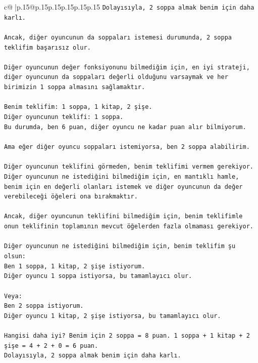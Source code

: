 \documentclass{article}
\begin{document}
{\begin{supertabular}{c@{$\;$}|p{.15\linewidth}@{}p{.15\linewidth}p{.15\linewidth}p{.15\linewidth}p{.15\linewidth}p{.15\linewidth}}
{{{\texttt{Dolayısıyla, 2 soppa almak benim için daha karlı.} \\
\\ 
\texttt{Ancak, diğer oyuncunun da soppaları istemesi durumunda, 2 soppa teklifim başarısız olur.} \\
\\ 
\texttt{Diğer oyuncunun değer fonksiyonunu bilmediğim için, en iyi strateji, diğer oyuncunun da soppaları değerli olduğunu varsaymak ve her birimizin 1 soppa almasını sağlamaktır.} \\
\\ 
\texttt{Benim teklifim: 1 soppa, 1 kitap, 2 şişe.} \\
\texttt{Diğer oyuncunun teklifi: 1 soppa.} \\
\texttt{Bu durumda, ben 6 puan, diğer oyuncu ne kadar puan alır bilmiyorum.} \\
\\ 
\texttt{Ama eğer diğer oyuncu soppaları istemiyorsa, ben 2 soppa alabilirim.} \\
\\ 
\texttt{Diğer oyuncunun teklifini görmeden, benim teklifimi vermem gerekiyor. Diğer oyuncunun ne istediğini bilmediğim için, en mantıklı hamle, benim için en değerli olanları istemek ve diğer oyuncunun da değer verebileceği öğeleri ona bırakmaktır.} \\
\\ 
\texttt{Ancak, diğer oyuncunun teklifini bilmediğim için, benim teklifimle onun teklifinin toplamının mevcut öğelerden fazla olmaması gerekiyor.} \\
\\ 
\texttt{Diğer oyuncunun ne istediğini bilmediğim için, benim teklifim şu olsun:} \\
\texttt{Ben 1 soppa, 1 kitap, 2 şişe istiyorum.} \\
\texttt{Diğer oyuncu 1 soppa istiyorsa, bu tamamlayıcı olur.} \\
\\ 
\texttt{Veya:} \\
\texttt{Ben 2 soppa istiyorum.} \\
\texttt{Diğer oyuncu 1 kitap, 2 şişe istiyorsa, bu tamamlayıcı olur.} \\
\\ 
\texttt{Hangisi daha iyi? Benim için 2 soppa = 8 puan. 1 soppa + 1 kitap + 2 şişe = 4 + 2 + 0 = 6 puan.} \\
\texttt{Dolayısıyla, 2 soppa almak benim için daha karlı.} \\
\\ 
}}}
\end{supertabular}}
\end{document}
